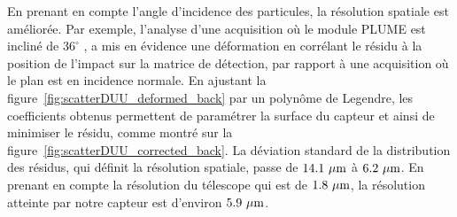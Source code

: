   En prenant en compte l'angle d'incidence des particules, la résolution spatiale est améliorée. 
  Par exemple, l'analyse d'une acquisition où le module PLUME est incliné de $36^{\circ}$ , a mis en évidence une déformation en corrélant le résidu à la position de l'impact sur la matrice de détection, par rapport à une acquisition où le plan est en incidence normale.
  En ajustant la figure~\ref{fig:scatterDUU_deformed_back} par un polynôme de Legendre, les coefficients obtenus permettent de paramétrer la surface du capteur et ainsi de minimiser le résidu, comme montré sur la figure~\ref{fig:scatterDUU_corrected_back}. 
  La déviation standard de la distribution des résidus, qui définit la résolution spatiale, passe de $14.1~\mu\rm{m}$ à $6.2~\mu\rm{m}$.
  En prenant en compte la résolution du télescope qui est de $1.8~\mu\rm{m}$, la résolution atteinte par notre capteur est d'environ $5.9~\mu\rm{m}$. 

